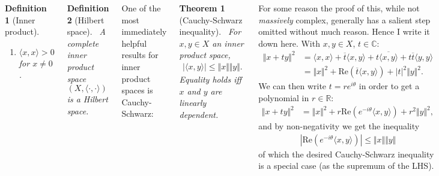 \documentclass{tikzposter} %
\newtheorem{theorem}{Theorem}
\newtheorem{definition}{Definition}
\begin{document}
\begin{columns}
{\begin{definition}[Inner product]
\begin{enumerate}[label={\roman*.}]
            \item $\langle x, x \rangle > 0$ for $x \neq 0$.
    \end{enumerate}
    \end{definition}
    \hphantom{}

    \begin{definition}[Hilbert space]
    \ A complete inner product space $(X, \langle \cdot, \cdot \rangle)$ is a Hilbert space.
    \end{definition}
    \hphantom{}

    One of the most immediately helpful results for inner product spaces is Cauchy-Schwarz:
    \begin{theorem}[Cauchy-Schwarz inequality]
    \ For $x, y \in X$ an inner product space,
    \begin{align*}
      |\langle x, y \rangle| \le \Vert x\Vert  \Vert y\Vert .
    \end{align*}
    Equality holds iff $x$ and $y$ are linearly dependent.
    \end{theorem}
    \hphantom{}

    For some reason the proof of this, while not \emph{massively} complex, generally has a salient step omitted without much reason. Hence I write it down here. With $x, y \in X$, $t \in \mathbb{C}$:
    \begin{align*}
      \Vert x+ty\Vert ^{2} &= \langle x, x \rangle + \overline{t} \langle x, y \rangle + t \overline{\langle x, y \rangle} + t \overline{t} \langle y , y \rangle \\
                   &= \Vert x\Vert ^{2} + \mathrm{Re}\left( \overline{t} \langle x, y \rangle \right) + |t|^{2}\Vert  y\Vert ^{2}.
    \end{align*}
    We can then write $t = re^{i \theta}$ in order to get a polynomial in $r \in \mathbb{R}$:
    \begin{align*}
      \Vert x+ty\Vert ^{2} &= \Vert x\Vert ^{2} + r \mathrm{Re} \left( e^{-i \theta} \langle x, y \rangle \right) + r^{2} \Vert y\Vert ^{2},
    \end{align*}
    and by non-negativity we get the inequality
    \begin{align*}
      \left|\mathrm{Re} \left(e^{-i \theta} \langle x, y \rangle \right)\right| \le \Vert x\Vert  \Vert y\Vert
    \end{align*}
    of which the desired Cauchy-Schwarz inequality is a special case (as the supremum of the LHS). \\

}
\end{columns}
\end{document}
